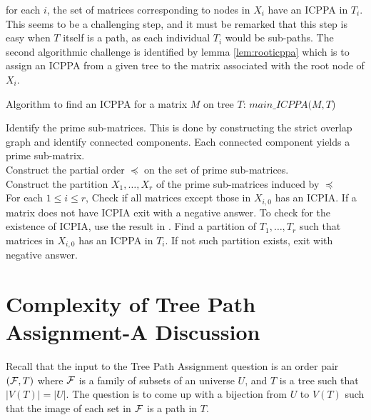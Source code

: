 for each $i$, the set of matrices corresponding to nodes in $X_i$ have
an ICPPA in $T_i$.  This seems to be a challenging step, and it must
be remarked that this step is easy when $T$ itself is a path, as each
individual $T_i$ would be sub-paths.  The second algorithmic challenge
is identified by lemma \ref{lem:rooticppa} which is to assign an ICPPA
from a given tree to the matrix associated with the root node of
$X_i$.
\begin{algorithm}[h]
  \caption{Algorithm to find an ICPPA for a matrix $M$ on tree $T$:
    $main\_ICPPA(M, T$)}
  \label{al:icppa-main}
  \begin{algorithmic}
    \STATE Identify the prime sub-matrices. This is done by constructing the strict overlap graph and identify connected components.  Each connected component yields a prime sub-matrix.   \\
    \STATE Construct the partial order $\preccurlyeq$ on the set of prime sub-matrices.  \\
    \STATE Construct the partition $X_1,\ldots,X_r$ of the prime
    sub-matrices induced by $\preccurlyeq$ \\
    \STATE For each $1 \leq i \leq r$, Check if all matrices except
    those in $X_{i,0}$ has an ICPIA.  If a matrix does not have ICPIA
    exit with a negative answer.  To check for the existence of ICPIA,
    use the result in \cite{nsnrs09}.  \STATE Find a partition of
    $T_1, \ldots, T_r$ such that matrices in $X_{i,0}$ has an ICPPA in
    $T_i$.  If not such partition exists, exit with negative answer.
  \end{algorithmic}
\end{algorithm}


\section[Complexity]{Complexity of Tree Path Assignment-A Discussion}
\label{sec:tplcomplexity}
Recall that the input to the Tree Path Assignment question is an order
pair $({\cal F},T)$ where ${\cal F}$ is a family of subsets of an universe $U$,
and $T$ is a tree such that $|V(T)| = |U|$.  The question is to come
up with a bijection from $U$ to $V(T)$ such that the image of each set
in ${\cal F}$ is a path in $T$.


